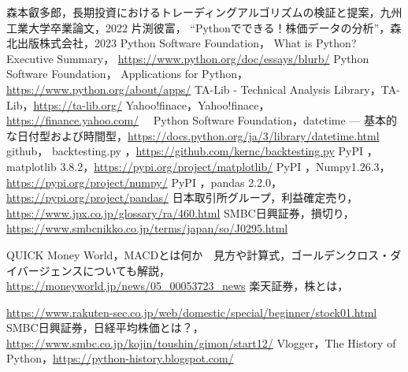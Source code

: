 \newpage {}  %

\begin{thebibliography}{99}
  森本叡多郎，長期投資におけるトレーディングアルゴリズムの検証と提案，九州工業大学卒業論文，2022
  片渕彼富， “Pythonでできる！株価データの分析”，森北出版株式会社，2023
  Python Software Foundation， What is Python? Executive Summary， \url{https://www.python.org/doc/essays/blurb/}
  Python Software Foundation， Applications for Python， \url{https://www.python.org/about/apps/}
   TA-Lib - Technical Analysis Library，TA-Lib，\url{https://ta-lib.org/}
  Yahoo!finace，Yahoo!finace， \url{https://finance.yahoo.com/}　  
  Python Software Foundation，datetime --- 基本的な日付型および時間型，\url{https://docs.python.org/ja/3/library/datetime.html} 
  github， backtesting.py ，\url{https://github.com/kernc/backtesting.py} 
  PyPI ，matplotlib 3.8.2，\url{https://pypi.org/project/matplotlib/}
  PyPI ，Numpy1.26.3，\url{https://pypi.org/project/numpy/}
  PyPI ，pandas 2.2.0，\url{https://pypi.org/project/pandas/}
  日本取引所グループ，利益確定売り，\url{https://www.jpx.co.jp/glossary/ra/460.html}
  SMBC日興証券，損切り， \url{https://www.smbcnikko.co.jp/terms/japan/so/J0295.html}

  QUICK Money World，MACDとは何か　見方や計算式，ゴールデンクロス・ダイバージェンスについても解説， \url{https://moneyworld.jp/news/05_00053723_news}
  楽天証券，株とは，
  
  \url{https://www.rakuten-sec.co.jp/web/domestic/special/beginner/stock01.html}
  SMBC日興証券，日経平均株価とは？，\url{https://www.smbc.co.jp/kojin/toushin/gimon/start12/}
  Vlogger，The History of Python，\url{https://python-history.blogspot.com/}
  \end{thebibliography}
  